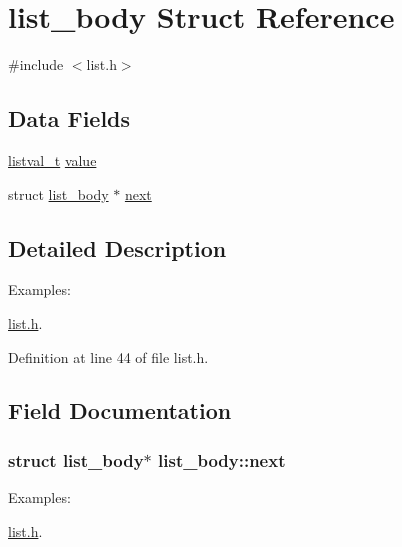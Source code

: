 \hypertarget{structlist__body}{\section{list\+\_\+body Struct Reference}
\label{structlist__body}
}


{\ttfamily \#include $<$list.\+h$>$}

\subsection*{Data Fields}
\begin{DoxyCompactItemize}
\item 
\hyperlink{list_8h_a83bc1af7566502e08756b8d8c425972e}{listval\+\_\+t} \hyperlink{structlist__body_ae3194d24911b82410a61d50f5e6f588d}{value}
\item 
struct \hyperlink{structlist__body}{list\+\_\+body} $\ast$ \hyperlink{structlist__body_ae0f31e0790456c070895880578d171ca}{next}
\end{DoxyCompactItemize}


\subsection{Detailed Description}
\begin{Desc}
\item[Examples\+: ]\par
\hyperlink{list_8h-example}{list.\+h}.\end{Desc}


Definition at line 44 of file list.\+h.



\subsection{Field Documentation}
\hypertarget{structlist__body_ae0f31e0790456c070895880578d171ca}{
\subsubsection[{next}]{\setlength{\rightskip}{0pt plus 5cm}struct {\bf list\+\_\+body}$\ast$ list\+\_\+body\+::next}}\label{structlist__body_ae0f31e0790456c070895880578d171ca}
\begin{Desc}
\item[Examples\+: ]\par
\hyperlink{list_8h-example}{list.\+h}.\end{Desc}


